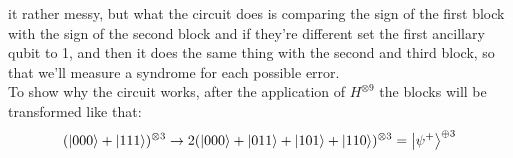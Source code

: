 \documentclass{article}
\begin{document}
	\begin{figure}[H]
	\centering
	\end{figure}
	\noindent it rather messy, but what the circuit does is comparing the sign of the first block with the sign of the second block and if they're different set the first ancillary qubit to 1, and then it does the same thing with the second and third block, so that we'll measure a syndrome for each possible error.\\
	To show why the circuit works, after the application of $H^{\otimes 9}$ the blocks will be transformed like that:
	\[  (\ket{000} + \ket{111})^{\otimes 3} \rightarrow 2(\ket{000} + \ket{011} + \ket{101} + \ket{110})^{\otimes 3} = \ket{\psi^+}^{\oplus 3}\]
\end{document}

